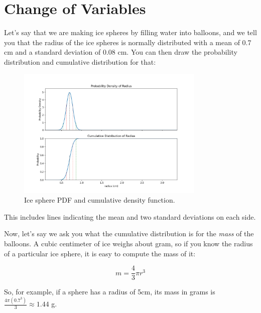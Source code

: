 \chapter{Change of Variables}

Let's say that we are making ice spheres by filling water into balloons, and we tell you that the radius of the ice spheres is normally distributed with a mean
of 0.7 cm and a standard deviation of 0.08 cm. You can then draw the probability distribution and cumulative distribution for that:

\begin{figure}[htbp]
  \centering
  \includegraphics[width=0.8\textwidth]{before.png}
  \caption{Ice sphere PDF and cumulative density function.}
  \label{fig:before}
\end{figure}

This includes lines indicating the mean and two standard deviations on each side.

Now, let's say we ask you what the cumulative distribution is for the \emph{mass} of the balloons. A cubic centimeter of ice weighs about gram, so if you know
the radius of a particular ice sphere, it is easy to compute the mass of it:

$$m = \frac{4}{3} \pi r^3$$

So, for example, if a sphere has a radius of 5cm, its mass in grams is $\frac{4 \pi (0.7^3)}{3} \approx 1.44$ g.

